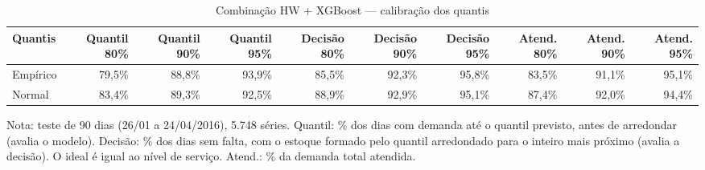 \begin{table}[htbp]
\centering
\small
\caption{Combinação HW + XGBoost — calibração dos quantis}
\label{tab:comb_calibracao}
\begin{tabular}{lrrrrrrrrr}
\toprule
Quantis & Quantil 80\% & Quantil 90\% & Quantil 95\% & Decisão 80\% & Decisão 90\% & Decisão 95\% & Atend. 80\% & Atend. 90\% & Atend. 95\% \\
\midrule
Empírico & 79,5\% & 88,8\% & 93,9\% & 85,5\% & 92,3\% & 95,8\% & 83,5\% & 91,1\% & 95,1\% \\
Normal & 83,4\% & 89,3\% & 92,5\% & 88,9\% & 92,9\% & 95,1\% & 87,4\% & 92,0\% & 94,4\% \\
\bottomrule
\end{tabular}
\par\smallskip
{\footnotesize Nota: teste de 90 dias (26/01 a 24/04/2016), 5.748 séries. Quantil: \% dos dias com demanda até o quantil previsto, antes de arredondar (avalia o modelo). Decisão: \% dos dias sem falta, com o estoque formado pelo quantil arredondado para o inteiro mais próximo (avalia a decisão). O ideal é igual ao nível de serviço. Atend.: \% da demanda total atendida.}
\end{table}
